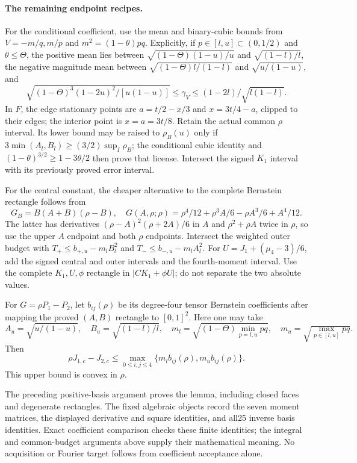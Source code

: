 \paragraph{The remaining endpoint recipes.}
For the conditional coefficient, use the mean and binary-cubic bounds
from $V=-m/q,m/p$ and $m^2=(1-\theta)pq$. Explicitly, if
$p\in[l,u]\subset(0,1/2)$ and $\theta\le\Theta$, the positive mean
lies between $\sqrt{(1-\Theta)(1-u)/u}$ and $\sqrt{(1-l)/l}$,
the negative magnitude mean between $\sqrt{(1-\Theta)l/(1-l)}$ and
$\sqrt{u/(1-u)}$, and
\[
 \sqrt{(1-\Theta)^3(1-2u)^2/[u(1-u)]}
 \le\gamma_V\le(1-2l)/\sqrt{l(1-l)}.
\]
In $F$, the edge stationary points are
$a=t/2-x/3$ and $x=3t/4-a$, clipped to their edges; the interior
point is $x=a=3t/8$. Retain the actual common $\rho$ interval.
Its lower bound may be raised to $\rho_B(u)$ only if
$3\min(A_l,B_l)\ge(3/2)\sup_I\rho_B$; the conditional cubic identity
and $(1-\theta)^{3/2}\ge1-3\theta/2$ then prove that license.
Intersect the signed $K_1$ interval with its previously proved error interval.

For the central constant, the cheaper alternative to the complete Bernstein
rectangle follows from
\[
 G_B=B(A+B)(\rho-B),\quad
 G(A,\rho;\rho)=\rho^4/12+\rho^3A/6-\rho A^3/6+A^4/12.
\]
The latter has derivatives $(\rho-A)^2(\rho+2A)/6$ in $A$ and
$\rho^2+\rho A$ twice in $\rho$, so use the upper $A$ endpoint and
both $\rho$ endpoints. Intersect the weighted outer budget with
$T_+\le b_{+,u}-m_lB_l^2$ and $T_-\le b_{-,u}-m_lA_l^2$.
For $U=J_1+(\mu_4-3)/6$, add the signed central and outer intervals
and the fourth-moment interval. Use the complete $K_1,U,\phi$ rectangle
in $|CK_1+\phi U|$; do not separate the two absolute values.

\begin{lemma}\label{j:local:entry201:central}
For $G=\rho P_1-P_2$, let $b_{ij}(\rho)$ be its degree-four tensor
Bernstein coefficients after mapping the proved $(A,B)$ rectangle to
$[0,1]^2$. Here one may take
\[
 A_u=\sqrt{u/(1-u)},\quad B_u=\sqrt{(1-l)/l},\quad
 m_l=\sqrt{(1-\Theta)\min_{p=l,u}pq},\quad
 m_u=\sqrt{\max_{p\in[l,u]}pq}.
\]
Then
\[
 \rho J_{1,c}-J_{2,c}\le
 \max_{0\le i,j\le4}\{m_l b_{ij}(\rho),m_u b_{ij}(\rho)\}.
\]
This upper bound is convex in $\rho$.
\end{lemma}
The preceding positive-basis argument proves the lemma, including closed
faces and degenerate rectangles. The fixed algebraic objects record the
seven moment matrices, the displayed derivative and square identities,
and all25 inverse basis identities. Exact coefficient comparison checks
these finite identities; the integral and common-budget arguments above
supply their mathematical meaning. No acquisition or Fourier target
follows from coefficient acceptance alone.
